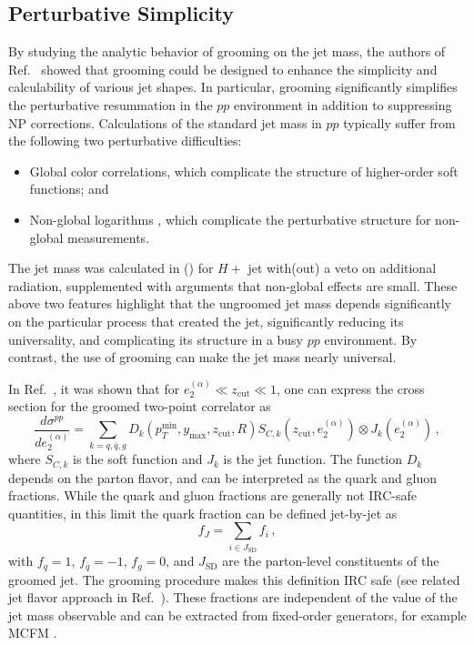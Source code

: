 \documentclass[11pt]{cernrep}
\begin{document}
\subsection{Perturbative Simplicity}
\label{jetsub_alphas_sec:pertsimplicity}

By studying the analytic behavior of grooming on the jet mass, the authors of Ref.~\cite{Dasgupta:2013ihk} showed that grooming could be designed to enhance the simplicity and calculability of various jet shapes.
%
In particular, grooming significantly simplifies the perturbative resummation in the $pp$ environment in addition to suppressing NP corrections.
%
Calculations of the standard jet mass in $pp$ typically suffer from the following two perturbative difficulties:
%
\begin{itemize}
%
\item Global color correlations, which complicate the structure of higher-order soft functions; and
%
\item Non-global logarithms \cite{Dasgupta:2001sh}, which complicate the perturbative structure for non-global measurements.
%
\end{itemize}
%
The jet mass was calculated in \cite{Jouttenus:2013hs} (\cite{arXiv:1207.1640}) for $H+$ jet with(out) a veto on additional radiation, supplemented with arguments that non-global effects are small.
%
These above two features highlight that the ungroomed jet mass depends significantly on the particular process that created the jet, significantly reducing its universality, and complicating its structure in a busy $pp$ environment.
%
By contrast, the use of grooming can make the jet mass nearly universal.

In Ref.~\cite{Frye:2016aiz}, it was shown that for $e_2^{(\alpha)}\ll z_{\mathrm{cut}}  \ll 1$, one can express the cross section for the groomed two-point correlator as
%
\begin{equation}
\label{jetsub_alphas_eq:fac_pp_e2}
\frac{d\sigma^{pp}}{de_2^{(\alpha)}}=\sum\limits_{k=q,\bar q, g}D_k(p_T^{\mathrm{min}}, y_\mathrm{max}, z_{\mathrm{cut}} , R) S_{C,k}(z_{\mathrm{cut}} , e_2^{(\alpha)})\otimes J_k (e_2^{(\alpha)})\,,
\end{equation}
%
where $S_{C,k}$ is the soft function and $J_k$ is the jet function.
%
The function $D_k$ depends on the parton flavor, and can be interpreted as the quark and gluon fractions.
%
While the quark and gluon fractions are generally not IRC-safe quantities, in this limit the quark fraction can be defined jet-by-jet as 
\begin{equation}
f_J=\sum\limits_{i\in J_{\mathrm{SD}}} f_i\,,
\end{equation}
with $f_q=1$, $f_{\bar q}=-1$, $f_g=0$, and $J_{\mathrm{SD}}$ are the parton-level constituents of the groomed jet.
%
The grooming procedure makes this definition IRC safe (see related jet flavor approach in Ref.~\cite{Banfi:2006hf}).
%
These fractions are independent of the value of the jet mass observable and can be extracted from fixed-order generators, for example MCFM \cite{Campbell:1999ah,Campbell:2010ff,Campbell:2011bn}.
\end{document}
